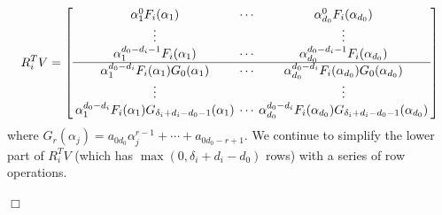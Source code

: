 \documentclass{article}
\newenvironment{proof}{\noindent{\em Proof:}}{$\Box$~\\}
\begin{document}
\begin{proof}
\begin{enumerate}
$$\setlength{\arraycolsep}{2pt}
{R_i^TV} = \left[ \begin{array}{*{20}{c}}
 {\alpha _1^0{F_i}({\alpha _1})}& \cdots &{\alpha _{{d_0}}^0{F_i}({\alpha _{{d_0}}})}\\
  \vdots &{}& \vdots \\
 {\alpha _1^{{d_0} - {d_i} - 1}{F_i}({\alpha _1})}& \cdots &{\alpha _{{d_0}}^{{d_0} - {d_i} - 1}{F_i}({\alpha _{{d_0}}})}\\
 \hline
\alpha_1^{{d_0} - {d_i}}{F_i}({\alpha_1})G_{0}(\alpha_1)& \cdots &
 \alpha_{{d_0}}^{{d_0} - {d_i}}{F_i}({\alpha_{{d_0}}})G_{0}(\alpha_{d_0})\\
  \vdots && \vdots \\
{\alpha _1^{{d_0} - {d_i}}{F_i}({\alpha _1})G_{\delta_i+d_i-d_0-1}(\alpha_1)}& \cdots &
{\alpha_{{d_0}}^{{d_0} - {d_i}}{F_i}({\alpha _{{d_0}}})G_{\delta_i+d_i-d_0-1}(\alpha_{d_0})}
\end{array} \right]
$$
where
$G_{r}(\alpha_j)={a_{{0d_0}}}\alpha _j^{r - 1} +  \cdots  + {a_{{0d_0} - r + 1}}$. We continue to simplify the lower part of $R_i^TV$ (which has $\max(0,\delta_i+d_i-d_0)$ rows) with a series of row operations.


\end{enumerate}
\end{proof}
\end{document}
